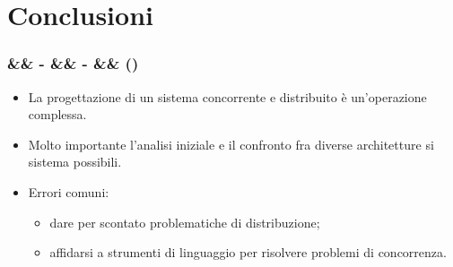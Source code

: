 \documentclass[slidestop,compress,blackandwhite]{beamer}
\newcommand{\cm}[1]{\vspace{#1cm}}
\newcommand{\newtitle}[4]{
	#1 
	\ifx&#2&%
	\else
  		\large- #2
	\fi
	\ifx&#3&%
	\else
  		\normalsize- #3
	\fi
	\ifx&#4&%
	\else
  		\normalsize (#4)
	\fi
}
\newcommand{\newframe}[5]{
	\begin{frame}
		\frametitle{\newtitle{#1}{#2}{#3}{#4}}
		#5
	\end{frame}
}
\newcommand{\myitemize}[1]{
	\begin{itemize}\itemsep4pt
	#1
	\end{itemize}
}
\begin{document}
\section{Conclusioni}\label{conclusions}
	
	\newframe{}{}{}{}{
		\cm{0.5}
		\myitemize {
			\item La progettazione di un sistema concorrente e distribuito è un'operazione complessa.
			\item Molto importante l'analisi iniziale e il confronto fra diverse architetture si sistema possibili.
			\item Errori comuni:
				\myitemize {
					\item dare per scontato problematiche di distribuzione;
					\item affidarsi a strumenti di linguaggio per risolvere problemi di concorrenza.
				}
		}
	}
	
\end{document}
